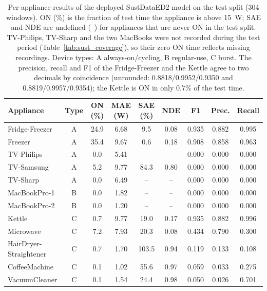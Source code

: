 \begin{table}[H]
\centering
\caption{Per-appliance results of the deployed SustDataED2 model on the test split (304 windows). ON (\%) is the fraction of test time the appliance is above 15~W; SAE and NDE are undefined (--) for appliances that are never ON in the test split. TV-Philips, TV-Sharp and the two MacBooks were not recorded during the test period (Table~\ref{tab:sust_coverage}), so their zero ON time reflects missing recordings. Device types: A always-on/cycling, B regular-use, C burst. The precision, recall and F1 of the Fridge-Freezer and the Kettle agree to two decimals by coincidence (unrounded: 0.8818/0.9952/0.9350 and 0.8819/0.9957/0.9354); the Kettle is ON in only 0.7\% of the test time.}
\label{tab:SustDataED2_per_appliance}
\footnotesize
\begin{tabular}{@{}lcccccccc@{}}
\toprule
Appliance & Type & ON (\%) & MAE (W) & SAE (\%) & NDE & F1 & Prec. & Recall \\
\midrule
Fridge-Freezer & A & 24.9 & 6.68 & 9.5 & 0.08 & 0.935 & 0.882 & 0.995 \\
Freezer & A & 35.4 & 9.67 & 0.6 & 0.18 & 0.908 & 0.858 & 0.963 \\
TV-Philips & A & 0.0 & 5.41 & -- & -- & 0.000 & 0.000 & 0.000 \\
TV-Samsung & A & 5.2 & 9.77 & 84.3 & 0.80 & 0.000 & 0.000 & 0.000 \\
TV-Sharp & A & 0.0 & 6.49 & -- & -- & 0.000 & 0.000 & 0.000 \\
MacBookPro-1 & B & 0.0 & 1.82 & -- & -- & 0.000 & 0.000 & 0.000 \\
MacBookPro-2 & B & 0.0 & 1.20 & -- & -- & 0.000 & 0.000 & 0.000 \\
Kettle & C & 0.7 & 9.77 & 19.0 & 0.17 & 0.935 & 0.882 & 0.996 \\
Microwave & C & 7.2 & 7.93 & 20.3 & 0.08 & 0.434 & 0.790 & 0.300 \\
HairDryer-Straightener & C & 0.7 & 1.70 & 103.5 & 0.94 & 0.119 & 0.133 & 0.108 \\
CoffeeMachine & C & 0.1 & 1.02 & 55.6 & 0.97 & 0.059 & 0.033 & 0.275 \\
VacuumCleaner & C & 0.1 & 1.54 & 24.4 & 0.98 & 0.050 & 0.026 & 0.701 \\
\bottomrule
\end{tabular}
\end{table}

